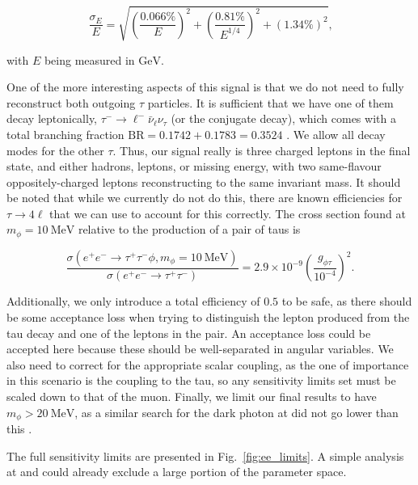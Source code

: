 \begin{equation}
    \frac{\sigma_E}{E} = \sqrt{\left(\frac{0.066\%}{E}\right)^2 + \left(\frac{0.81\%}{E^{1/4}}\right)^2 + \left(1.34\%\right)^2}\textrm{,}
\end{equation}

\noindent with $E$ being measured in $\textrm{GeV}$.

One of the more interesting aspects of this signal is that we do not need to fully reconstruct both outgoing $\tau$ particles.
It is sufficient that we have one of them decay leptonically, $\tau^- \rightarrow \ell^- \bar{\nu}_\ell \nu_\tau$ (or the conjugate decay), which comes with a total branching fraction $\textrm{BR} = 0.1742 + 0.1783 = 0.3524$ \cite{Agashe:2014kda}.
We allow all decay modes for the other $\tau$.
Thus, our signal really is three charged leptons in the final state, and either hadrons, leptons, or missing energy, with two same-flavour oppositely-charged leptons reconstructing to the same invariant mass.
It should be noted that while we currently do not do this, there are known efficiencies for $\tau \rightarrow 4\ell$ that we can use to account for this correctly.
The cross section found at $m_\phi = 10~\textrm{MeV}$ relative to the production of a pair of taus is

\begin{equation}
    \frac{\sigma\left(e^+ e^- \rightarrow \tau^+ \tau^- \phi, m_\phi = 10~\textrm{MeV}\right)}{\sigma\left(e^+ e^- \rightarrow \tau^+ \tau^-\right)} = 2.9 \times 10^{-9} \left(\frac{g_{\phi\tau}}{10^{-4}}\right)^2\textrm{.}
\end{equation}

\noindent Additionally, we only introduce a total efficiency of $0.5$ to be safe, as there should be some acceptance loss when  trying to distinguish the lepton produced from the tau decay and one of the leptons in the pair.
An acceptance loss could be accepted here because these should be well-separated in angular variables.
We also need to correct for the appropriate scalar coupling, as the one of importance in this scenario is the coupling to the tau, so any sensitivity limits set must be scaled down to that of the muon.
Finally, we limit our final results to have $m_\phi > 20~\textrm{MeV}$, as a similar search for the dark photon at \babar did not go lower than this \cite{Lees:2014xha}.

The full sensitivity limits are presented in Fig.~\ref{fig:ee_limits}.
A simple analysis at \babar and \belle could already exclude a large portion of the parameter space.

